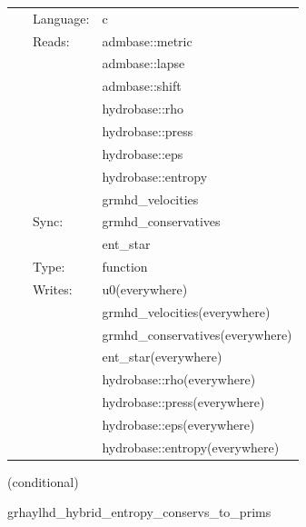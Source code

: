  \begin{tabular*}{160mm}{cll} 
~ & Language:  & c \\ 
~ & Reads:  & admbase::metric \\ 
~& ~ &admbase::lapse\\ 
~& ~ &admbase::shift\\ 
~& ~ &hydrobase::rho\\ 
~& ~ &hydrobase::press\\ 
~& ~ &hydrobase::eps\\ 
~& ~ &hydrobase::entropy\\ 
~& ~ &grmhd\_velocities\\ 
~ & Sync:  & grmhd\_conservatives \\ 
~& ~ &ent\_star\\ 
~ & Type:  & function \\ 
~ & Writes:  & u0(everywhere) \\ 
~& ~ &grmhd\_velocities(everywhere)\\ 
~& ~ &grmhd\_conservatives(everywhere)\\ 
~& ~ &ent\_star(everywhere)\\ 
~& ~ &hydrobase::rho(everywhere)\\ 
~& ~ &hydrobase::press(everywhere)\\ 
~& ~ &hydrobase::eps(everywhere)\\ 
~& ~ &hydrobase::entropy(everywhere)\\ 
\end{tabular*} 


\vspace{5mm}

   (conditional) 

\hspace{5mm} grhaylhd\_hybrid\_entropy\_conservs\_to\_prims 

\hspace{5mm}{\it entropy+hybrid version of grhaylhd\_conservs\_to\_prims } 


\hspace{5mm}

